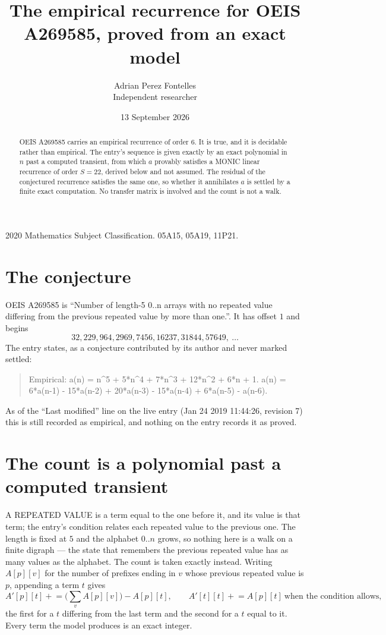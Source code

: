 \documentclass[11pt,a4paper]{article}
\title{The empirical recurrence for OEIS A269585, proved from an exact model}
\author{Adrian Perez Fontelles\\ \small Independent researcher}
\date{13 September 2026}
\theoremstyle{plain}
\theoremstyle{definition}
\begin{document}
\maketitle

\begin{abstract}
OEIS A269585 carries an empirical recurrence of order $6$. It is true, and it is
decidable rather than empirical. The entry's sequence is given exactly by an exact polynomial in $n$ past a computed transient, from
which $a$ provably satisfies a MONIC linear recurrence of order $S=22$, derived below and not
assumed. The residual of the conjectured recurrence satisfies the same one, so whether it
annihilates $a$ is settled by a finite exact computation. No transfer matrix is involved and
the count is not a walk.
\end{abstract}

\noindent\small 2020 Mathematics Subject Classification. 05A15, 05A19, 11P21.\normalsize

\section{The conjecture}

OEIS A269585 is ``Number of length-5 0..n arrays with no repeated value differing from the previous repeated value by more than one.''. It has offset $1$ and begins
\[
32, 229, 964, 2969, 7456, 16237, 31844, 57649,\ \dots
\]
The entry states, as a conjecture contributed by its author and never marked settled:
\begin{quote}
Empirical: a(n) = n\^{}5 + 5*n\^{}4 + 7*n\^{}3 + 12*n\^{}2 + 6*n + 1. a(n) = 6*a(n-1) - 15*a(n-2) + 20*a(n-3) - 15*a(n-4) + 6*a(n-5) - a(n-6).
\end{quote}
As of the ``Last modified'' line on the live entry (Jan 24 2019 11:44:26, revision 7)
this is still recorded as empirical, and nothing on the entry records it as proved.

\section{The count is a polynomial past a computed transient}

A REPEATED VALUE is a term equal to the one before it, and its value is that term; the entry's
condition relates each repeated value to the previous one. The length is fixed at $5$ and the
alphabet $0..n$ grows, so nothing here is a walk on a finite digraph --- the state that
remembers the previous repeated value has as many values as the alphabet. The count is taken
exactly instead. Writing $A[p][v]$ for the number of prefixes ending in $v$ whose previous
repeated value is $p$, appending a term $t$ gives
\[
A'[p][t] \mathrel{+}= \Big(\sum_v A[p][v]\Big) - A[p][t],
\qquad
A'[t][t] \mathrel{+}= A[p][t]\ \text{when the condition allows},
\]
the first for a $t$ differing from the last term and the second for a $t$ equal to it. Every
term the model produces is an exact integer.
\end{document}
